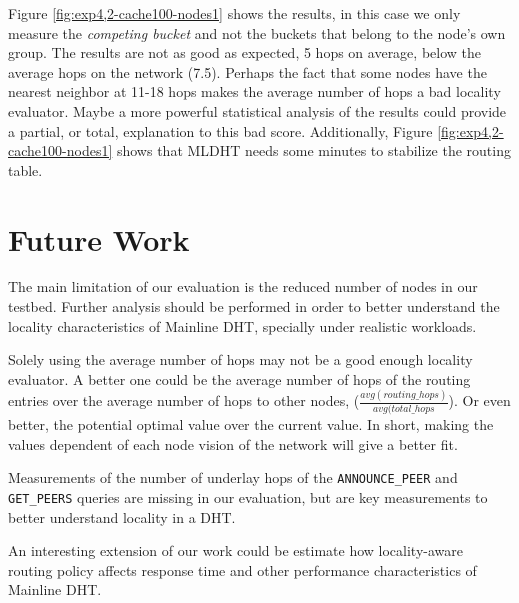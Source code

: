 \documentclass[conference]{IEEEtran}
\begin{document}
Figure \ref{fig:exp4,2-cache100-nodes1} shows the results, in this case we only measure the \textit{competing bucket} and not the buckets that belong to the node's own group. The results are not as good as expected, 5 hops on average, below the average hops on the network (7.5). Perhaps the fact that some nodes have the nearest neighbor at 11-18 hops makes the average number of hops a bad locality evaluator. Maybe a more powerful statistical analysis of the results could provide a partial, or total, explanation to this bad score. Additionally, Figure \ref{fig:exp4,2-cache100-nodes1} shows that MLDHT needs some minutes to stabilize the routing table. 

\section{Future Work}

The main limitation of our evaluation is the reduced number of nodes in our testbed. Further analysis should be performed in order to better understand the locality characteristics of Mainline DHT, specially under realistic workloads.

Solely using the average number of hops may not be a good enough locality evaluator. A better one could be the average number of hops of the routing entries over the average number of hops to other nodes, ($\frac{avg(routing\_hops)}{avg(total\_hops}$). Or even better, the potential optimal value over the current value. In short, making the values dependent of each node vision of the network will give a better fit.

Measurements of the number of underlay hops of the \texttt{ANNOUNCE\_PEER} and \texttt{GET\_PEERS} queries are missing in our evaluation, but are key measurements to better understand locality in a DHT.

An interesting extension of our work could be estimate how locality-aware routing policy affects response time and other performance characteristics of Mainline DHT.



%
%
\end{document}
